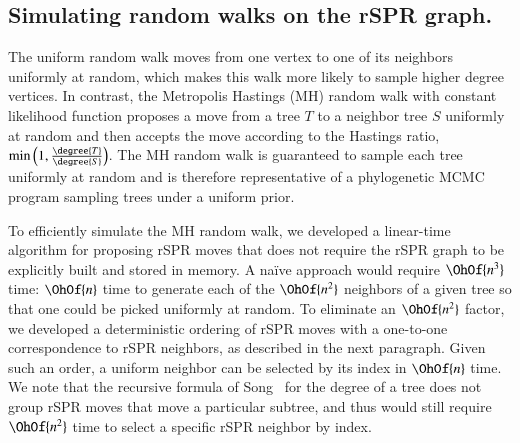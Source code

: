 \documentclass[]{elsarticle}
\begin{document}
\subsection{Simulating random walks on the rSPR graph.}
\label{sec:random_walks}
The uniform random walk moves from one vertex to one of its neighbors uniformly at random, which makes this walk more likely to sample higher degree vertices.
In contrast, the Metropolis Hastings (MH) random walk with constant likelihood function proposes a move from a tree $T$ to a neighbor tree $S$ uniformly at random and then accepts the move according to the Hastings ratio, $\min\left(1, \frac{\degree{T}}{\degree{S}}\right)$.
The MH random walk is guaranteed to sample each tree uniformly at random and is therefore representative of a phylogenetic MCMC program sampling trees under a uniform prior.

To efficiently simulate the MH random walk, we developed a linear-time algorithm for proposing rSPR moves that does not require the rSPR graph to be explicitly built and stored in memory.
A na\"ive approach would require $\OhOf{n^3}$ time: $\OhOf{n}$ time to generate each of the $\OhOf{n^2}$ neighbors of a given tree so that one could be picked uniformly at random.
To eliminate an $\OhOf{n^2}$ factor, we developed a deterministic ordering of rSPR moves with a one-to-one correspondence to rSPR neighbors, as described in the next paragraph.
Given such an order, a uniform neighbor can be selected by its index in $\OhOf{n}$ time.
We note that the recursive formula of Song~\citep{Song2003-gf} for the degree of a tree does not group rSPR moves that move a particular subtree, and thus would still require $\OhOf{n^2}$ time to select a specific rSPR neighbor by index.
\end{document}
